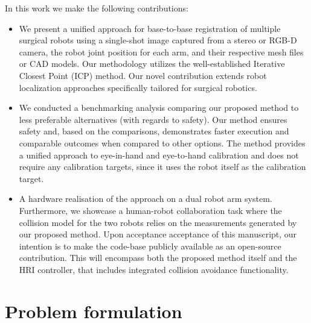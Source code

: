 In this work we make the following contributions:
\begin{itemize}
    \item We present a unified approach for base-to-base registration of multiple surgical robots using a single-shot image captured from a stereo or RGB-D camera, the robot joint position for each arm, and their respective mesh files or CAD models. Our methodology utilizes the well-established Iterative Closest Point (ICP) method. Our novel contribution extends robot localization approaches specifically tailored for surgical robotics.
    \item We conducted a benchmarking analysis comparing our proposed method to less preferable alternatives (with regards to safety). Our method ensures safety and, based on the comparisons, demonstrates faster execution and comparable outcomes when compared to other options. The method provides a unified approach to eye-in-hand and eye-to-hand calibration and does not require any calibration targets, since it uses the robot itself as the calibration target.
    \item A hardware realisation of the approach on a dual robot arm system. Furthermore, we showcase a human-robot collaboration task where the collision model for the two robots relies on the measurements generated by our proposed method. Upon acceptance acceptance of this manuscript, our intention is to make the code-base publicly available as an open-source contribution. This will encompass both the proposed method itself and the HRI controller, that includes integrated collision avoidance functionality.
\end{itemize}




\section{Problem formulation}

